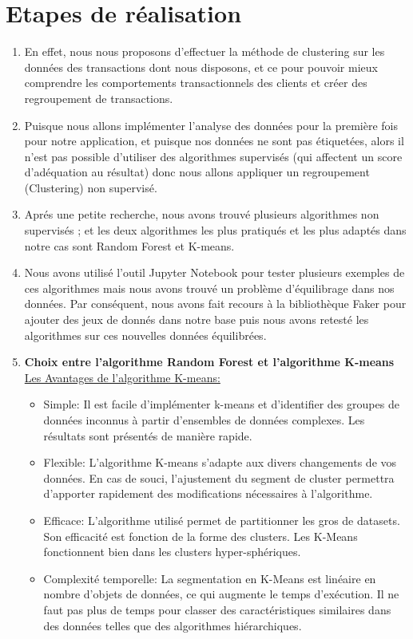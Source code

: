 \section{ Etapes de réalisation}
\begin{enumerate}
    \item
En effet, nous nous proposons d'effectuer la méthode de clustering sur les données des transactions dont nous disposons, et ce pour pouvoir mieux comprendre les comportements transactionnels des clients et créer des regroupement de transactions.
    \item
Puisque nous allons implémenter l'analyse des données pour la première fois pour notre application, et puisque nos données ne sont pas étiquetées, alors il n'est pas possible d'utiliser des algorithmes supervisés (qui affectent un score d'adéquation au résultat) donc nous allons appliquer un regroupement (Clustering) non supervisé.
\item Aprés une petite recherche, nous avons trouvé plusieurs algorithmes non supervisés ; et les deux algorithmes les plus pratiqués et les plus adaptés dans notre cas sont Random Forest et K-means.
\item Nous avons utilisé l'outil Jupyter Notebook pour tester plusieurs exemples de ces algorithmes mais nous avons trouvé un problème d'équilibrage dans nos données. Par conséquent, nous avons fait recours à la bibliothèque Faker pour ajouter des jeux de donnés dans notre base puis nous avons retesté les algorithmes sur ces nouvelles données équilibrées.
\item \textbf{Choix entre l'algorithme Random Forest et l'algorithme K-means}
\newline
\underline {Les Avantages de l'algorithme K-means:}
\begin{itemize}
    \item Simple:
Il est facile d’implémenter k-means et d’identifier des groupes de données inconnus à partir d’ensembles de données complexes. Les résultats sont présentés de manière rapide.
\item Flexible:
L’algorithme K-means s’adapte aux divers changements de vos données. En cas de souci, l’ajustement du segment de cluster permettra d’apporter rapidement des modifications nécessaires à l’algorithme.
\item Efficace:
L’algorithme utilisé permet de partitionner les gros de datasets. Son efficacité est fonction de la forme des clusters. Les K-Means fonctionnent bien dans les clusters hyper-sphériques.
\item Complexité temporelle:
La segmentation en K-Means est linéaire en nombre d’objets de données, ce qui augmente le temps d’exécution. Il ne faut pas plus de temps pour classer des caractéristiques similaires dans des données telles que des algorithmes hiérarchiques.



\end{itemize}
\end{enumerate}
